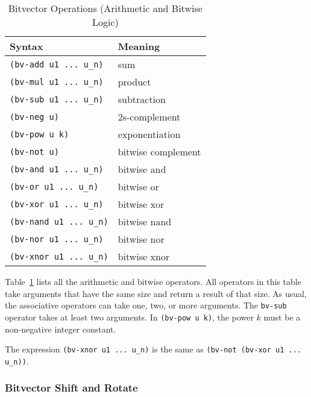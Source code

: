 \documentclass[11pt,twoside,fleqn,openright,titlepage]{cslreport}
\begin{document}
\begin{table}
\begin{small}
\begin{center}
\begin{tabular}{|p{5cm}|l|}
\hline Syntax & Meaning \\
\hline
\texttt{(bv-add u1 ... u\_n)} & sum \\
\texttt{(bv-mul u1 ... u\_n)} & product \\
\texttt{(bv-sub u1 ... u\_n)} & subtraction \\
\texttt{(bv-neg u)} & 2s-complement \\
\texttt{(bv-pow u k)} & exponentiation \\
\hline
\texttt{(bv-not u)} & bitwise complement \\
\texttt{(bv-and u1 ... u\_n)} & bitwise and \\
\texttt{(bv-or u1 ... u\_n)} & bitwise or \\
\texttt{(bv-xor u1 ... u\_n)} & bitwise xor \\
\texttt{(bv-nand u1 ... u\_n)} & bitwise nand \\
\texttt{(bv-nor u1 ... u\_n)} & bitwise nor \\
\texttt{(bv-xnor u1 ... u\_n)} & bitwise xnor \\
\hline
\end{tabular}
\end{center}
\end{small}
\caption{Bitvector Operations (Arithmetic and Bitwise Logic)}
\label{bitvectors1}
\end{table}

Table~\ref{bitvectors1} lists all the arithmetic and bitwise
operators. All operators in this table take arguments that have the
same size and return a result of that size.  As usual, the associative
operators can take one, two, or more arguments. The \texttt{bv-sub}
operator takes at least two arguments. In \texttt{(bv-pow u k)},
the power $k$ must be a non-negative integer constant.

\medskip\noindent
The expression \texttt{(bv-xnor u1 ... u\_n)} is the same as
\texttt{(bv-not (bv-xor u1 ... u\_n))}.

\subsubsection*{Bitvector Shift and Rotate}
\end{document}
